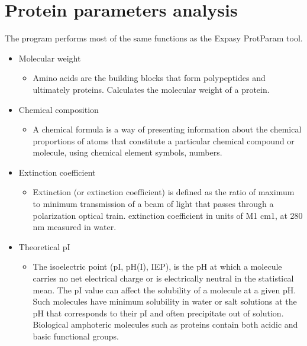 \documentclass[letterpaper,10pt,english]{jupyterBook}
\begin{document}
\sphinxstepscope


\chapter{Protein parameters analysis}
\label{\detokenize{ipynb/chapter1:protein-parameters-analysis}}\label{\detokenize{ipynb/chapter1::doc}}
\sphinxAtStartPar
The program performs most of the same functions as the Expasy ProtParam tool.
\begin{itemize}
\item {} 
\sphinxAtStartPar
Molecular weight
\begin{itemize}
\item {} 
\sphinxAtStartPar
Amino acids are the building blocks that form polypeptides and ultimately proteins. Calculates the molecular weight of a protein.

\end{itemize}

\item {} 
\sphinxAtStartPar
Chemical composition
\begin{itemize}
\item {} 
\sphinxAtStartPar
A chemical formula is a way of presenting information about the chemical proportions of atoms that constitute a particular chemical compound or molecule, using chemical element symbols, numbers.

\end{itemize}

\item {} 
\sphinxAtStartPar
Extinction coefficient
\begin{itemize}
\item {} 
\sphinxAtStartPar
Extinction (or extinction coefficient) is defined as the ratio of maximum to minimum transmission of a beam of light that passes through a polarization optical train. extinction coefficient in units of  M\sphinxhyphen{}1 cm\sphinxhyphen{}1, at 280 nm measured in water.

\end{itemize}

\item {} 
\sphinxAtStartPar
Theoretical pI
\begin{itemize}
\item {} 
\sphinxAtStartPar
The isoelectric point (pI, pH(I), IEP), is the pH at which a molecule carries no net electrical charge or is electrically neutral in the statistical mean. The pI value can affect the solubility of a molecule at a given pH. Such molecules have minimum solubility in water or salt solutions at the pH that corresponds to their pI and often precipitate out of solution. Biological amphoteric molecules such as proteins contain both acidic and basic functional groups.


\end{itemize}
\end{itemize}
\end{document}
